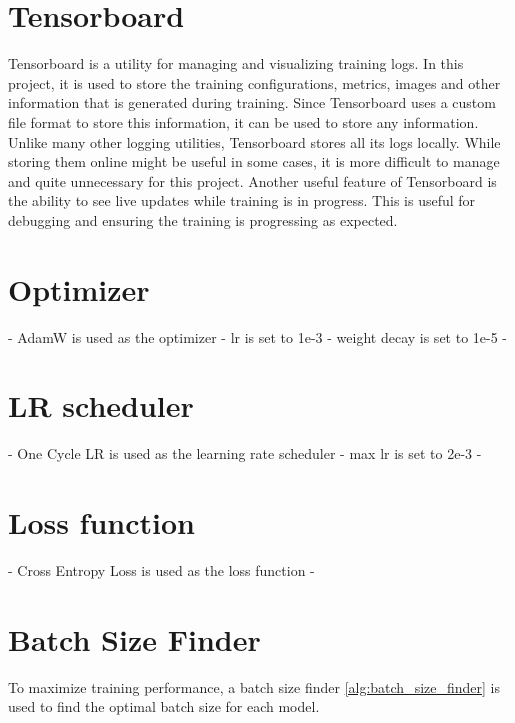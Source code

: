\section{Tensorboard}
Tensorboard is a utility for managing and visualizing training logs. In this project, it is used to store the training configurations, metrics, images and other information that is generated during training. Since Tensorboard uses a custom file format to store this information, it can be used to store any information. Unlike many other logging utilities, Tensorboard stores all its logs locally. While storing them online might be useful in some cases, it is more difficult to manage and quite unnecessary for this project.
Another useful feature of Tensorboard is the ability to see live updates while training is in progress. This is useful for debugging and ensuring the training is progressing as expected.

\section{Optimizer}
- AdamW is used as the optimizer
- lr is set to 1e-3
- weight decay is set to 1e-5
- 

\section{LR scheduler}
- One Cycle LR is used as the learning rate scheduler
- max lr is set to 2e-3
- 

\section{Loss function}
- Cross Entropy Loss is used as the loss function
- 

\section{Batch Size Finder}
To maximize training performance, a batch size finder \ref{alg:batch_size_finder} is used to find the optimal batch size for each model.

